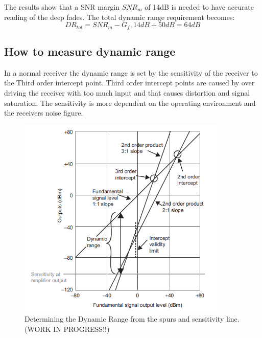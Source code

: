 The results show that a SNR margin $SNR_m$ of 14dB is needed to have accurate reading of the deep fades.
The total dynamic range requirement becomes:
\begin{equation}
DR_{tot} = SNR_m - G_f , 14dB + 50dB = 64dB 
\end{equation}
\begin{where}
\end{where}



\subsection{How to measure dynamic range}

In a normal receiver the dynamic range is set by the sensitivity of the receiver to the Third order intercept point. Third order intercept points are caused by over driving the receiver with too much input and that causes distortion and signal saturation. The sensitivity is more dependent on the operating environment and the receivers noise figure. \citep{understandDynamic}


\begin{figure}[H]
\centering
\includegraphics[width=0.90\textwidth]{figures/Dynamic_range_calc.png}
\caption{Determining the Dynamic Range from the spurs and sensitivity line.(WORK IN PROGRESS!!)}
\label{Dynamic_range_calc}
\end{figure}
 
